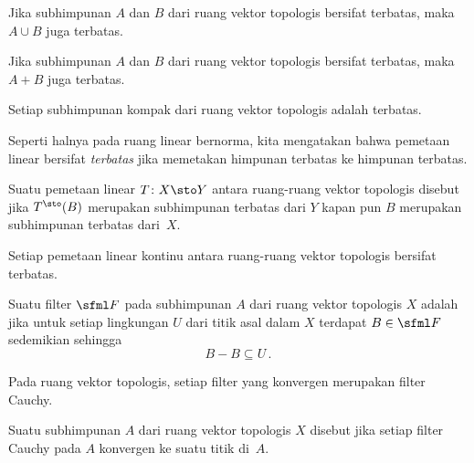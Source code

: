\begin{prop} Jika subhimpunan $A$ dan $B$ dari ruang vektor topologis bersifat terbatas, maka $A \cup B$ juga terbatas.
\end{prop}

\begin{prop} Jika subhimpunan $A$ dan $B$ dari ruang vektor topologis bersifat terbatas, maka $A + B$ juga terbatas.
\end{prop}

\begin{prop} Setiap subhimpunan kompak dari ruang vektor topologis adalah terbatas.
\end{prop}

Seperti halnya pada ruang linear bernorma, kita mengatakan bahwa pemetaan linear bersifat \emph{terbatas} jika memetakan himpunan terbatas ke himpunan terbatas.

\begin{defn} Suatu pemetaan linear $T\colon X \sto Y$ antara ruang-ruang vektor topologis disebut
 jika $T^\sto(B)$ merupakan subhimpunan terbatas dari $Y$ kapan pun $B$ merupakan subhimpunan terbatas dari~$X$.
\end{defn}

\begin{prop} Setiap pemetaan linear kontinu antara ruang-ruang vektor topologis bersifat terbatas.
\end{prop}

\begin{defn} Suatu filter $\sfml F$ pada subhimpunan $A$ dari ruang vektor topologis $X$ adalah
 jika untuk setiap lingkungan $U$ dari titik asal dalam $X$ terdapat $B \in \sfml F$ sedemikian sehingga
   \[ B - B \subseteq U\,. \]
\end{defn}

\begin{prop} Pada ruang vektor topologis, setiap filter yang konvergen merupakan filter Cauchy.
\end{prop}

\begin{defn} Suatu subhimpunan $A$ dari ruang vektor topologis $X$ disebut
 jika setiap filter Cauchy pada $A$ konvergen ke suatu titik di~$A$.
\end{defn}

